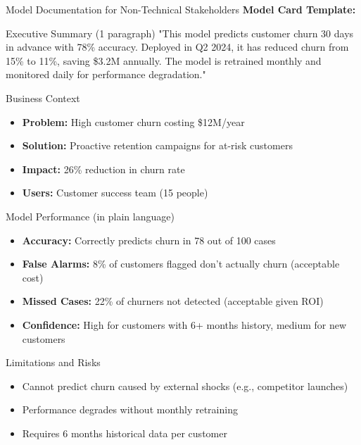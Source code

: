 \begin{frame}[fragile]{Model Documentation for Non-Technical Stakeholders}
\textbf{Model Card Template:}

\begin{block}{Executive Summary (1 paragraph)}
"This model predicts customer churn 30 days in advance with 78\% accuracy. Deployed in Q2 2024, it has reduced churn from 15\% to 11\%, saving \$3.2M annually. The model is retrained monthly and monitored daily for performance degradation."
\end{block}

\begin{block}{Business Context}
\begin{itemize}
\item \textbf{Problem:} High customer churn costing \$12M/year
\item \textbf{Solution:} Proactive retention campaigns for at-risk customers
\item \textbf{Impact:} 26\% reduction in churn rate
\item \textbf{Users:} Customer success team (15 people)
\end{itemize}
\end{block}

\begin{block}{Model Performance (in plain language)}
\begin{itemize}
\item \textbf{Accuracy:} Correctly predicts churn in 78 out of 100 cases
\item \textbf{False Alarms:} 8\% of customers flagged don't actually churn (acceptable cost)
\item \textbf{Missed Cases:} 22\% of churners not detected (acceptable given ROI)
\item \textbf{Confidence:} High for customers with 6+ months history, medium for new customers
\end{itemize}
\end{block}

\begin{block}{Limitations and Risks}
\begin{itemize}
\item Cannot predict churn caused by external shocks (e.g., competitor launches)
\item Performance degrades without monthly retraining
\item Requires 6 months historical data per customer
\end{itemize}
\end{block}
\end{frame}

